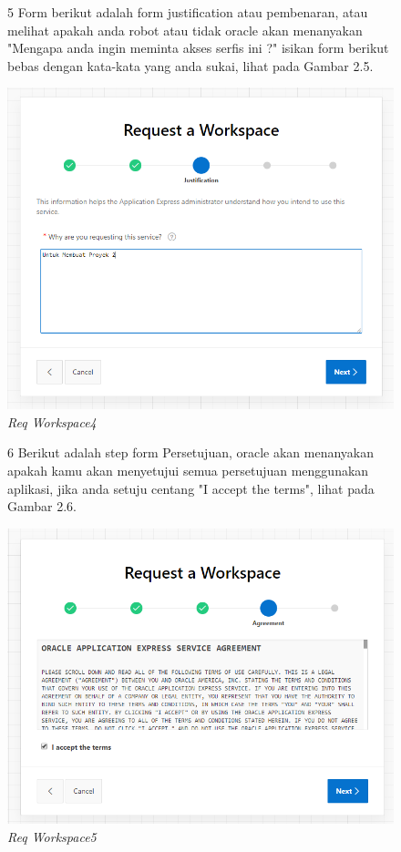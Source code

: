 \begin{itemize}
        \begin{figure}[!htbp]
        \item[5]Form berikut adalah form justification atau pembenaran, atau melihat apakah anda robot atau tidak oracle akan menanyakan "Mengapa anda ingin meminta akses serfis ini ?" isikan form berikut bebas dengan kata-kata yang anda sukai, lihat pada Gambar 2.5.
        \begin{center}
        \includegraphics[scale=0.5]{figures/5.png}
        \caption{\textit{Req Workspace4}}
        \end{center}
        \end{figure}
        
        \begin{figure}[!htbp]
        \item[6]Berikut adalah step form Persetujuan, oracle akan menanyakan apakah kamu akan menyetujui semua persetujuan menggunakan aplikasi, jika anda setuju centang "I accept the terms", lihat pada Gambar 2.6.
        \begin{center}
        \includegraphics[scale=0.5]{figures/6.png}
        \caption{\textit{Req Workspace5}}
        \end{center}
        \end{figure}


\end{itemize}
